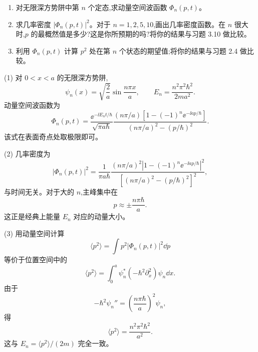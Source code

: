\begin{question}
\begin{enumerate}
\item 对无限深方势阱中第 $n$ 个定态,求动量空间波函数 $\Phi_n(p,t)$。
\item 求几率密度 $|\Phi_n(p,t)|^2$。对于 $n=1,2,5,10$,画出几率密度函数。在 $n$ 很大时,$p$ 的最概然值是多少?这是你所预期的吗?将你的结果与习题 3.10 做比较。
\item 利用 $\Phi_n(p,t)$ 计算 $p^2$ 处在第 $n$ 个状态的期望值;将你的结果与习题 2.4 做比较。
\end{enumerate}
\begin{solution}
(1) 对 $0<x<a$ 的无限深方势阱,
\[
\psi_n(x)=\sqrt{\frac2a}\sin\frac{n\pi x}{a},
\qquad E_n=\frac{n^2\pi^2\hbar^2}{2ma^2}.
\]
动量空间波函数为
\[
\Phi_n(p,t)=\frac{\ee^{-\ii E_nt/\hbar}}{\sqrt{\pi a\hbar}}
\frac{(n\pi/a)\left[1-(-1)^n\ee^{-\ii ap/\hbar}\right]}
{(n\pi/a)^2-(p/\hbar)^2}.
\]
该式在表面奇点处取极限即可。

(2) 几率密度为
\[
|\Phi_n(p,t)|^2=\frac1{\pi a\hbar}
\frac{(n\pi/a)^2\left|1-(-1)^n\ee^{-\ii ap/\hbar}\right|^2}
{\left[(n\pi/a)^2-(p/\hbar)^2\right]^2},
\]
与时间无关。对于大的 $n$,主峰集中在
\[
\boxed{p\approx \pm\frac{n\pi\hbar}{a}.}
\]
这正是经典上能量 $E_n$ 对应的动量大小。

(3) 用动量空间计算
\[
\langle p^2\rangle=\int p^2|\Phi_n(p,t)|^2\dd p
\]
等价于位置空间中的
\[
\langle p^2\rangle=\int_0^a\psi_n^*(-\hbar^2\partial_x^2)\psi_n\dd x.
\]
由于
\[
-\hbar^2\psi_n''=\left(\frac{n\pi\hbar}{a}\right)^2\psi_n,
\]
得
\[
\boxed{\langle p^2\rangle=\frac{n^2\pi^2\hbar^2}{a^2}.}
\]
这与 $E_n=\langle p^2\rangle/(2m)$ 完全一致。
\end{solution}
\end{question}

